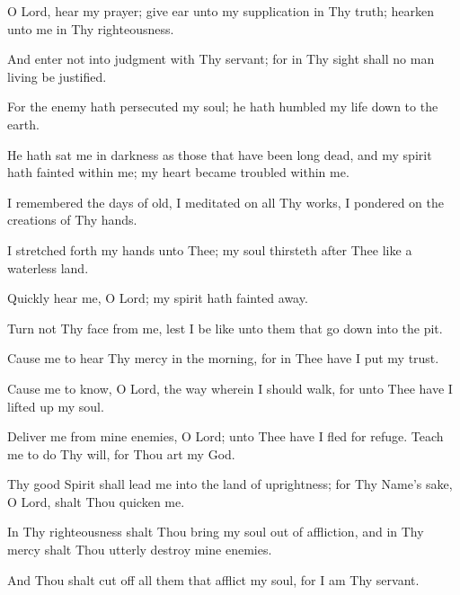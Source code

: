 O Lord, hear my prayer; give ear unto my supplication in Thy truth; hearken unto me in Thy righteousness.

And enter not into judgment with Thy servant; for in Thy sight shall no man living be justified.

For the enemy hath persecuted my soul; he hath humbled my life down to the earth.

He hath sat me in darkness as those that have been long dead, and my spirit hath fainted within me; my heart became troubled within me.

I remembered the days of old, I meditated on all Thy works, I pondered on the creations of Thy hands.

I stretched forth my hands unto Thee; my soul thirsteth after Thee like a waterless land.

Quickly hear me, O Lord; my spirit hath fainted away.

Turn not Thy face from me, lest I be like unto them that go down into the pit.

Cause me to hear Thy mercy in the morning, for in Thee have I put my trust.

Cause me to know, O Lord, the way wherein I should walk, for unto Thee have I lifted up my soul.

Deliver me from mine enemies, O Lord; unto Thee have I fled for refuge. Teach me to do Thy will, for Thou art my God.

Thy good Spirit shall lead me into the land of uprightness; for Thy Name’s sake, O Lord, shalt Thou quicken me.

In Thy righteousness shalt Thou bring my soul out of affliction, and in Thy mercy shalt Thou utterly destroy mine enemies.

And Thou shalt cut off all them that afflict my soul, for I am Thy servant.
